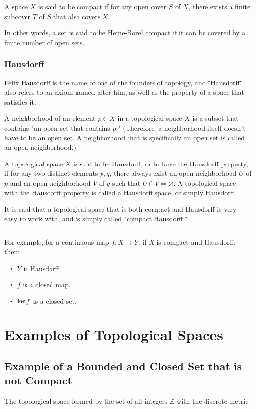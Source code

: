 \documentclass[article,letterpaper,12pt]{jsarticle}
\begin{document}
A space $X$ is said to be compact if for any open cover $S$ of $X$, there exists a finite subcover $T$ of $S$ that also covers $X$.

In other words, a set is said to be Heine-Borel compact if it can be covered by a finite number of open sets.

\subsubsection{Hausdorff}

Felix Hausdorff is the name of one of the founders of topology, and "Hausdorff" also refers to an axiom named after him, as well as the property of a space that satisfies it.

A neighborhood of an element $p \in X$ in a topological space $X$ is a subset that contains "an open set that contains $p$." (Therefore, a neighborhood itself doesn't have to be an open set. A neighborhood that is specifically an open set is called an open neighborhood.)

A topological space $X$ is said to be Hausdorff, or to have the Hausdorff property, if for any two distinct elements $p,q$, there always exist an open neighborhood $U$ of $p$ and an open neighborhood $V$ of $q$ such that $U \cap V = \varnothing$.
A topological space with the Hausdorff property is called a Hausdorff space, or simply Hausdorff.

It is said that a topological space that is both compact and Hausdorff is very easy to work with, and is simply called "compact Hausdorff."

${}$

For example, for a continuous map $f: X \to Y$, if $X$ is compact and Hausdorff, then:

\ ・ $Y$ is Hausdorff.

\ ・ $f$ is a closed map.

\ ・ ${\rm ker} f $ is a closed set.



\section{Examples of Topological Spaces}

\subsection{Example of a Bounded and Closed Set that is not Compact}

The topological space formed by the set of all integers $\mathbb{Z}$ with the discrete metric
\end{document}
